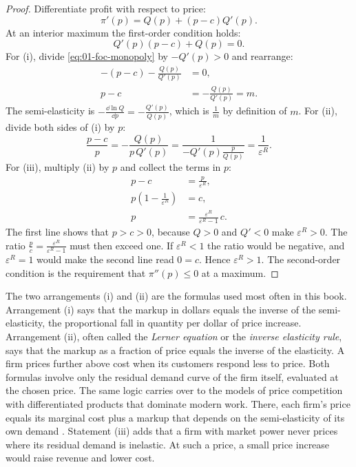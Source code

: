 \begin{proof}
Differentiate profit with respect to price:
\[
  \pi'(p) = Q(p) + (p - c)Q'(p).
\]
At an interior maximum the first-order condition holds:
\begin{equation}\label{eq:01-foc-monopoly}
  Q'(p)(p - c) + Q(p) = 0 .
\end{equation}
For (i), divide \eqref{eq:01-foc-monopoly} by $-Q'(p) > 0$ and rearrange:
\begin{align*}
  -(p - c) - \frac{Q(p)}{Q'(p)} &= 0, \\
  p - c &= -\frac{Q(p)}{Q'(p)} = m .
\end{align*}
The semi-elasticity is $-\frac{\dd \ln Q}{\dd p} = -\frac{Q'(p)}{Q(p)}$, which is $\frac{1}{m}$ by definition of
$m$. For (ii), divide both sides of (i) by $p$:
\[
  \frac{p - c}{p} = -\frac{Q(p)}{p\,Q'(p)} = \frac{1}{-Q'(p)\frac{p}{Q(p)}} = \frac{1}{\varepsilon^R} .
\]
For (iii), multiply (ii) by $p$ and collect the terms in $p$:
\begin{align*}
  p - c &= \frac{p}{\varepsilon^R}, \\
  p\left(1 - \frac{1}{\varepsilon^R}\right) &= c, \\
  p &= \frac{\varepsilon^R}{\varepsilon^R - 1}\, c .
\end{align*}
The first line shows that $p > c > 0$, because $Q > 0$ and $Q' < 0$ make $\varepsilon^R > 0$. The ratio
$\frac{p}{c} = \frac{\varepsilon^R}{\varepsilon^R - 1}$ must then exceed one. If $\varepsilon^R < 1$ the ratio
would be negative, and $\varepsilon^R = 1$ would make the second line read $0 = c$. Hence $\varepsilon^R > 1$.
The second-order condition is the requirement that $\pi''(p) \le 0$ at a maximum.
\end{proof}

The two arrangements (i) and (ii) are the formulas used most often in this book. Arrangement (i) says that the
markup in dollars equals the inverse of the semi-elasticity, the proportional fall in quantity per dollar of
price increase. Arrangement (ii), often called the \emph{Lerner equation} or the \emph{inverse elasticity rule},
says that the markup as a fraction of price equals the inverse of the elasticity. A firm prices further above
cost when its customers respond less to price. Both formulas involve only the residual demand curve of the firm
itself, evaluated at the chosen price. The same logic carries over to the models of price competition with
differentiated products that dominate modern work. There, each firm's price equals its marginal cost plus a
markup that depends on the semi-elasticity of its own demand \citep[p.~151]{EinavLevin2010}. Statement (iii) adds that a firm with market power never prices where
its residual demand is inelastic. At such a price, a small price increase would raise revenue and lower cost.

